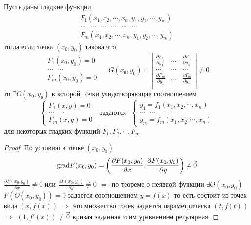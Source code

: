 \begin{theorem}
  Пусть  даны гладкие функции
  $$
  \begin{array}{c}
    F_1 (x_1, x_2, \cdots, x_n, y_1, y_2, \cdots, y_m) \\
    \dots ~~~ \dots ~~~ \dots ~~~ \dots  ~~~ \dots ~~~ \dots \\
    F_m (x_1, x_2, \cdots, x_n, y_1, y_2, \cdots, y_m)
  \end{array}
  $$
  тогда если точка $(x_0, y_0)$ такова что
  $$
  \begin{array}{c}
    F_1(x_0, y_0) = 0 \\
    \ldots ~~~ \ldots \\
    F_m(x_0, y_0) = 0 \\
  \end{array} ~~~~~~
  G(x_0, y_0) = \left|
  \begin{array}{ccc}
    \frac{\partial F_1}{\partial y_1} & \dots &
    \frac{\partial F_1}{\partial y_m} \\

    \dots & \dots & \dots \\

    \frac{\partial F_m}{\partial y_1} & \dots &
    \frac{\partial F_m}{\partial y_m} \\
  \end{array}
  \right|
  \not= 0
  $$
  то $\exists O(x_0, y_0)$ в которой точки улидотворяющие соотношением
  $$
  \left\{
  \begin{array}{c}
    F_1(x, y) = 0 \\
    \dots ~~~ \dots \\
    F_m(x, y) = 0
  \end{array}
  \right. ~~~ \text{задаются} ~~~
  \left\{
  \begin{array}{c}
    y_1 = f_1(x_1, x_2, \cdots, x_n)\\
    \dots ~~~ \dots ~~~ \dots ~~~ \dots \\
    y_m = f_m(x_1, x_2, \cdots, x_n)
  \end{array}
  \right.
  $$
  для некоторых гладких функций $F_1, F_2, \cdots, F_m $
\end{theorem}

\begin{proof}
  По условию в точке $(x_0, y_0)$
  $$
  \mathrm{grad} F(x_0, y_0) = \left( \frac{\partial F(x_0, y_0)}{\partial x},
  \frac{\partial F(x_0, y_0)}{\partial y} \right) \not= \vec 0
  $$
  $\frac{\partial F(x_0, y_0)}{\partial x} \not= 0$ или
  $\frac{\partial F(x_0, y_0)}{\partial y} \not= 0$ $\Rightarrow$
  по теореме о неявной функции $\exists O(x_0, y_0)$ $F(O(x_0, y_0)) = 0$
  задается соотношением $y = f(x)$
  то есть состоит из точек вида $(x, f(x))$ $\Rightarrow$ это множество точек
  задается параметрически $(t, f(t))$  $\Rightarrow$
  $(1, f'(x)) \not= \vec 0$ кривая заданная этим уравнением регулярная.
\end{proof}

